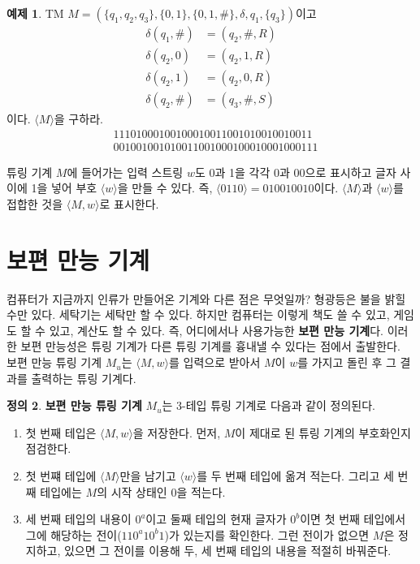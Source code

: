 \documentclass[b5paper, 10pt]{book}
\theoremstyle{definition}
\newtheorem{defn}{정의}[chapter]
\newtheorem{ex}[defn]{예제}
\begin{document}
\begin{ex}
    TM $M = (\{q_1, q_2, q_3\}, \{0, 1\}, \{0, 1, \#\}, \delta , q_1, \{q_3\})$이고 
    \begin{align*}
        \delta(q_1, \#) &= (q_2, \# , R) \\ 
        \delta(q_2, 0) &= (q_2, 1, R) \\ 
        \delta(q_2, 1) &= (q_2, 0, R) \\ 
        \delta(q_2, \#) &= (q_3, \#, S) 
    \end{align*}
    이다. $\langle M \rangle$을 구하라. 
    \begin{align*}
        &11101000100100010011001010010010011\\ 
        &001001001010011001000100010001000111
    \end{align*}
\end{ex}
튜링 기계 $M$에 들어가는 입력 스트링 $w$도 0과 1을 각각 0과 00으로 표시하고 글자 사이에 1을 넣어 
부호 $\langle w \rangle$을 만들 수 있다. 즉, $\langle 0110 \rangle = 010010010$이다. $\langle M \rangle$과
$\langle w \rangle$를 접합한 것을 $\langle M, w \rangle$로 표시한다. 
\section{보편 만능 기계}
컴퓨터가 지금까지 인류가 만들어온 기계와 다른 점은 무엇일까? 형광등은 불을 밝힐 수만 있다. 세탁기는 세탁만 할 수 있다.
하지만 컴퓨터는 이렇게 책도 쓸 수 있고, 게임도 할 수 있고, 계산도 할 수 있다. 즉, 어디에서나 사용가능한 
\textbf{보편 만능 기계}다. 이러한 보편 만능성은 튜링 기계가 다른 튜링 기계를 흉내낼 수 있다는 점에서 출발한다. \\ 
보편 만능 튜링 기계 $M_u$는 $\langle M, w\rangle$를 입력으로 받아서 $M$이 $w$를 가지고 돌린 후
그 결과를 출력하는 튜링 기계다. 
\begin{defn}
    \textbf{보편 만능 튜링 기계} $M_u$는 3-테입 튜링 기계로 다음과 같이 정의된다.
    \begin{enumerate}
        \item 첫 번째 테입은 $\langle M, w \rangle$을 저장한다. 먼저, $M$이 제대로 된 튜링 기계의
        부호화인지 점검한다. 
        \item 첫 번쨰 테입에 $\langle M \rangle$만을 남기고 $\langle w \rangle$를
        두 번째 테입에 옮겨 적는다. 그리고 세 번째 테입에는 $M$의 시작 상태인 $0$을 적는다. 
        \item 세 번째 테입의 내용이 $0^a$이고 둘째 테입의 현재 글자가 $0^b$이면 첫 번째 테입에서
        그에 해당하는 전이($110^a10^b1$)가 있는지를 확인한다. 그런 전이가 없으면 $M$은 정지하고, 있으면
        그 전이를 이용해 두, 세 번째 테입의 내용을 적절히 바꿔준다. 
    \end{enumerate}
\end{defn}
\end{document}
